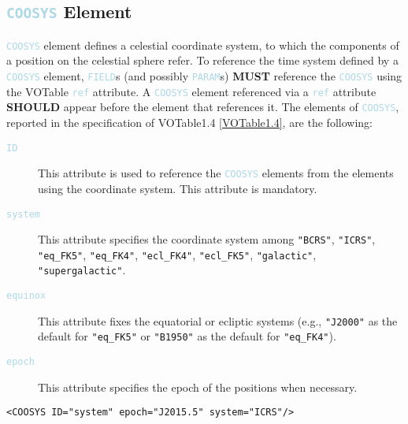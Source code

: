 \documentclass[11pt,a4paper]{ivoa}
\newcommand\elem[1]{\textcolor{LightBlue}{{\tt#1}}}
\begin{document}
\subsection{\elem{COOSYS} Element}
\elem{COOSYS} element defines a celestial coordinate system, to which the components of a position on the celestial sphere refer.
To reference the time system defined by a \elem{COOSYS} element, \elem{FIELD}s (and possibly \elem{PARAM}s) \textbf{MUST} reference the \elem{COOSYS} using the VOTable \elem{ref} attribute. A \elem{COOSYS} element referenced via a \elem{ref} attribute \textbf{SHOULD} appear before the element that references it. The elements of \elem{COOSYS}, reported in the specification of VOTable1.4 \ref{VOTable1.4}, are the following:
\begin{description}
     \item[\elem{ID}] This attribute is used to reference the \elem{COOSYS} elements from the elements using the coordinate system. This attribute is mandatory.
     \item[\elem{system}] This attribute specifies the coordinate system among \verb|"BCRS"|, \verb|"ICRS"|, \verb|"eq_FK5"|, \verb|"eq_FK4"|, \verb|"ecl_FK4"|, \verb|"ecl_FK5"|, \verb|"galactic"|, \verb|"supergalactic"|. 
     \item[\elem{equinox}] This attribute fixes the equatorial or ecliptic systems (e.g., \verb|"J2000"| as the default for \verb|"eq_FK5"| or \verb|"B1950"| as the default for \verb|"eq_FK4"|).
     \item[\elem{epoch}] This attribute specifies the epoch of the positions when necessary.
\end{description}

\noindent
\begingroup\footnotesize
\begin{tcolorbox}
\begin{verbatim}
<COOSYS ID="system" epoch="J2015.5" system="ICRS"/>
\end{verbatim}
\end{tcolorbox}
\endgroup
\end{document}
